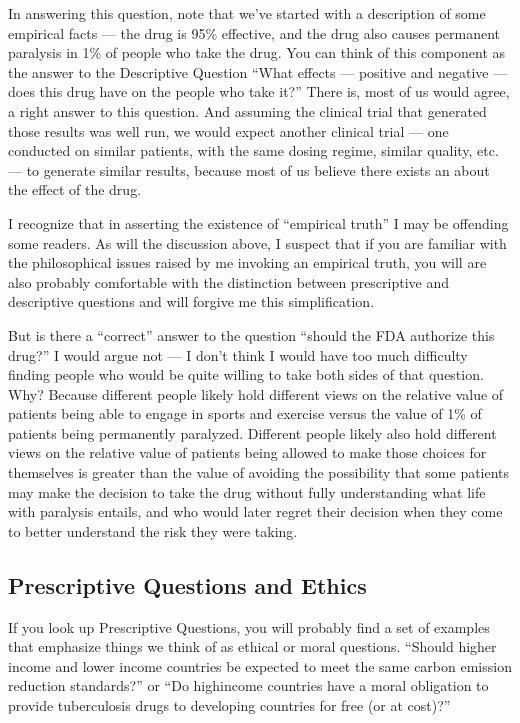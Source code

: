 \documentclass[letterpaper,10pt,english]{jupyterBook}
\begin{document}
\sphinxAtStartPar
In answering this question, note that we’ve started with a description of some empirical facts — the drug is 95\% effective, and the drug also causes permanent paralysis in 1\% of people who take the drug. You can think of this component as the answer to the Descriptive Question “What effects — positive and negative — does this drug have on the people who take it?” There is, most of us would agree, a right answer to this question. And assuming the clinical trial that generated those results was well run, we would expect another clinical trial — one conducted on similar patients, with the same dosing regime, similar quality, etc. — to generate similar results, because most of us believe there exists an  about the effect of the drug.%
\begin{footnote}[2]\sphinxAtStartFootnote
I recognize that in asserting the existence of “empirical truth” I may be offending some readers. As will the discussion above, I suspect that if you are familiar with the philosophical issues raised by me invoking an empirical truth, you will are also probably comfortable with the distinction between prescriptive and descriptive questions and will forgive me this simplification.
%
\end{footnote}

\sphinxAtStartPar
But is there a “correct” answer to the question “should the FDA authorize this drug?” I would argue not — I don’t think I would have too much difficulty finding people who would be quite willing to take both sides of that question. Why? Because different people likely hold different views on the relative value of patients being able to engage in sports and exercise versus the value of 1\% of patients being permanently paralyzed. Different people likely also hold different views on the relative value of patients being allowed to make those choices for themselves is greater than the value of avoiding the possibility that some patients may make the decision to take the drug without fully understanding what life with paralysis entails, and who would later regret their decision when they come to better understand the risk they were taking.


\subsection{Prescriptive Questions and Ethics}
\label{\detokenize{30_questions/05_descriptive_v_prescriptive:prescriptive-questions-and-ethics}}
\sphinxAtStartPar
If you look up Prescriptive Questions, you will probably find a set of examples that emphasize things we think of as ethical or moral questions. “Should higher income and lower income countries be expected to meet the same carbon emission reduction standards?” or “Do high\sphinxhyphen{}income countries have a moral obligation to provide tuberculosis drugs to developing countries for free (or at cost)?”
\end{document}
